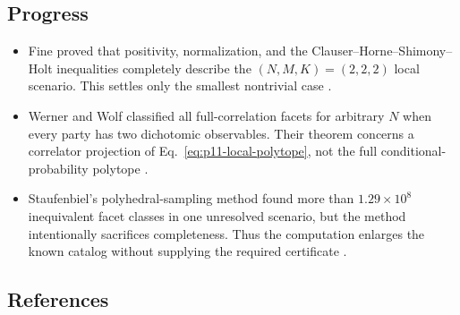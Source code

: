 \subsection*{Progress}

\begin{itemize}
  \item Fine proved that positivity, normalization, and the
  Clauser--Horne--Shimony--Holt inequalities completely describe the
  $(N,M,K)=(2,2,2)$ local scenario.  This settles only the smallest
  nontrivial case
  .

  \item Werner and Wolf classified all full-correlation facets for arbitrary
  $N$ when every party has two dichotomic observables.  Their theorem concerns
  a correlator projection of Eq.~\eqref{eq:p11-local-polytope}, not the full
  conditional-probability polytope
  .

  \item Staufenbiel's polyhedral-sampling method found more than
  $1.29\times10^8$ inequivalent facet classes in one unresolved scenario, but
  the method intentionally sacrifices completeness.  Thus the computation
  enlarges the known catalog without supplying the required certificate
  .
\end{itemize}

\subsection*{References}

